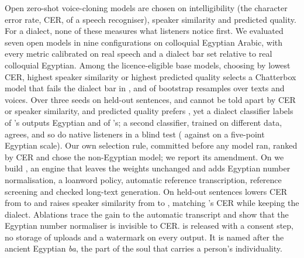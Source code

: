 Open zero-shot voice-cloning models are chosen on intelligibility (the character error rate, CER, of a speech
recogniser), speaker similarity and predicted quality. For a dialect, none of these measures what listeners notice
first. We evaluated seven open models in nine configurations on colloquial Egyptian Arabic, with every metric
calibrated on real speech and a dialect bar set relative to real colloquial Egyptian. Among the licence-eligible base
models, choosing by lowest CER, highest speaker similarity or highest predicted quality selects a Chatterbox model that
fails the dialect bar in ,  and 
of bootstrap resamples over texts and voices. Over three seeds on held-out sentences, \vox and \cbthree cannot be told
apart by CER or speaker similarity, and predicted quality prefers \cbthree, yet a dialect classifier labels
 of \vox's outputs Egyptian and  of \cbthree's; a second classifier,
trained on different data, agrees, and so do  native listeners in a blind test ( against
 on a five-point Egyptian scale). Our own selection rule, committed before any model ran, ranked by CER and chose the
non-Egyptian model; we report its amendment. On \vox we build \BA, an engine that leaves the weights unchanged and adds
Egyptian number normalisation, a loanword policy, automatic reference transcription, reference screening and checked
long-text generation. On held-out sentences \BA lowers CER from  to
 and raises speaker similarity from  to
, matching \cbthree's CER while keeping the dialect. Ablations trace the gain to the
automatic transcript and show that the Egyptian number normaliser is invisible to CER. \BA is released with a consent
step, no storage of uploads and a watermark on every output. It is named after the ancient Egyptian \emph{ba}, the part
of the soul that carries a person's individuality.
